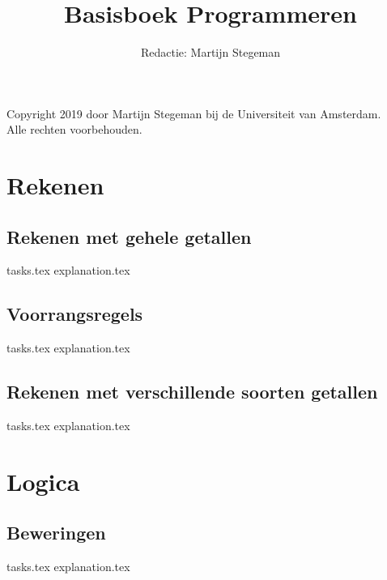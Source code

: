 \def\doclang{dutch}
\def\langdir{nl}




    \title{Basisboek Programmeren}
    \author{Redactie: Martijn Stegeman}
    \maketitle

    Copyright 2019 door Martijn Stegeman bij de Universiteit van Amsterdam.\\
    Alle rechten voorbehouden.

    \tableofcontents

    \chapter{Rekenen}
    \newpage

    \section{Rekenen met gehele getallen}
    {tasks.tex}          \newpage
    {explanation.tex}       \newpage

    \section{Voorrangsregels}
    {tasks.tex}        \newpage
    {explanation.tex}     \newpage

    \section{Rekenen met verschillende soorten getallen}
    {tasks.tex}            \newpage
    {explanation.tex}         \newpage

    \chapter{Logica}
    \newpage

    \section{Beweringen}
    {tasks.tex}         \newpage
    {explanation.tex}      \newpage

